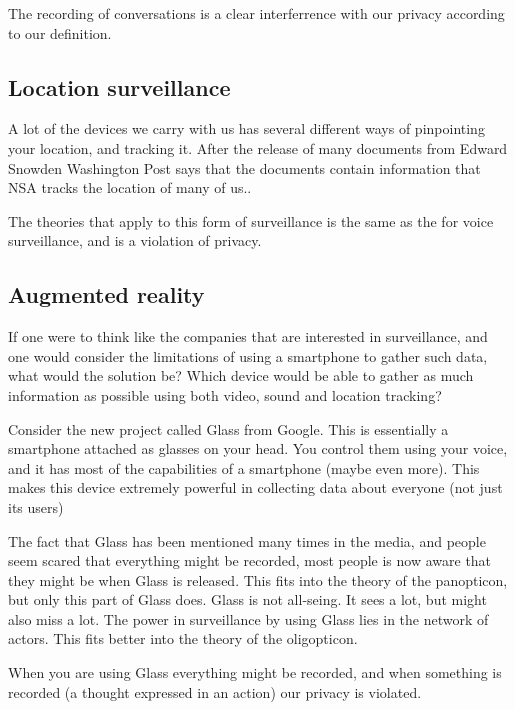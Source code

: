 The recording of conversations is a clear interferrence with our privacy according to our definition.

\subsection{Location surveillance}
A lot of the devices we carry with us has several different ways of pinpointing your location, and tracking it. After the release of many documents from Edward Snowden Washington Post says that the documents contain information that NSA tracks the location of many of us.\cite{website:nsa-track}.

The theories that apply to this form of surveillance is the same as the for voice surveillance, and is a violation of privacy.

\subsection{Augmented reality}
If one were to think like the companies that are interested in surveillance, and one would consider the limitations of using a smartphone to gather such data, what would the solution be? Which device would be able to gather as much information as possible using both video, sound and location tracking?

Consider the new project called Glass from Google. This is essentially a smartphone attached as glasses on your head. You control them using your voice, and it has most of the capabilities of a smartphone (maybe even more). This makes this device extremely powerful in collecting data about everyone (not just its users)\cite{website:google-glass}

The fact that Glass has been mentioned many times in the media, and people seem scared that everything might be recorded, most people is now aware that they might be when Glass is released. This fits into the theory of the panopticon, but only this part of Glass does. Glass is not all-seing. It sees a lot, but might also miss a lot. The power in surveillance by using Glass lies in the network of actors. This fits better into the theory of the oligopticon.\cite{website:glass-fears}

When you are using Glass everything might be recorded, and when something is recorded (a thought expressed in an action) our privacy is violated.
